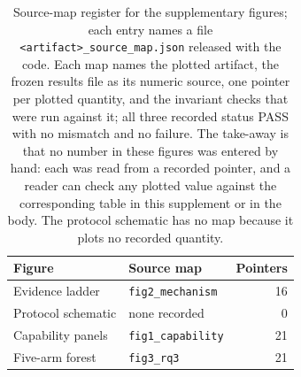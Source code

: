 \documentclass[letterpaper]{article}
\begin{document}
\begin{table}[t]
\centering
\small
\begin{tabular}{@{}llr@{}}
\toprule
Figure & Source map & Pointers \\
\midrule
Evidence ladder    & \texttt{fig2\_\allowbreak mechanism} & 16 \\
Protocol schematic & none recorded & 0 \\
Capability panels  & \texttt{fig1\_\allowbreak capability} & 21 \\
Five-arm forest    & \texttt{fig3\_\allowbreak rq3} & 21 \\
\bottomrule
\end{tabular}
\caption{Source-map register for the supplementary figures; each entry names a
file \texttt{<artifact>\_source\_map.json} released with the code.  Each map names the
plotted artifact, the frozen results file as its numeric source, one pointer per
plotted quantity, and the invariant checks that were run against it; all three
recorded status PASS with no mismatch and no failure.  The take-away is that no
number in these figures was entered by hand: each was read from a recorded
pointer, and a reader can check any plotted value against the corresponding table
in this supplement or in the body.  The protocol schematic has no map because it
plots no recorded quantity.}
\label{tab:s11-figmaps}
\end{table}

\end{document}
